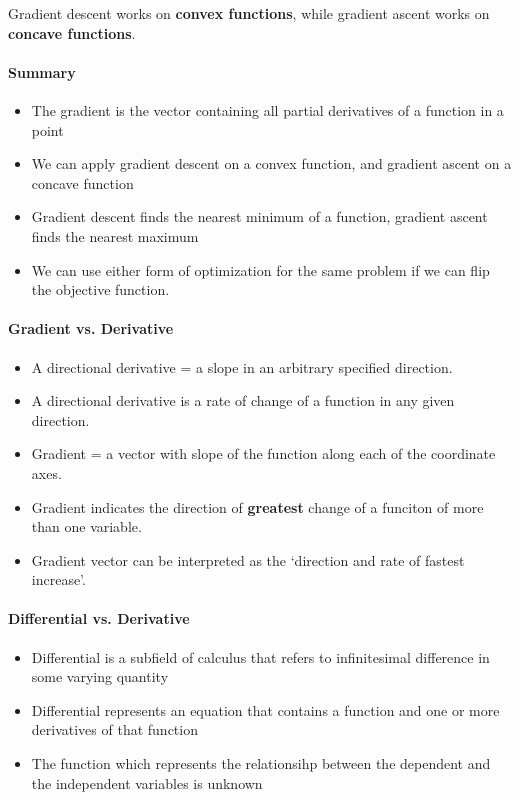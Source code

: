 \documentclass[lang=en,mode=geye,device=normal,color=blue,14pt]{elegantnote}
\DeclareMathOperator*{\1}{\mathbbm{1}}
\begin{document}
Gradient descent works on \textbf{convex functions}, while gradient ascent works on \textbf{concave functions}.

\paragraph{Summary}
\begin{itemize}
\item The gradient is the vector containing all partial derivatives of a function in a point
\item We can apply gradient descent on a convex function, and gradient ascent on a concave function
\item Gradient descent finds the nearest minimum of a function, gradient ascent finds the nearest maximum
\item We can use either form of optimization for the same problem if we can flip the objective function.
\end{itemize}

\paragraph{Gradient vs. Derivative}

\begin{itemize}
\item A directional derivative = a slope in an arbitrary specified direction.
\item A directional derivative is a rate of change of a function in any given direction.
\end{itemize}

\begin{itemize}
\item Gradient = a vector with slope of the function along each of the coordinate axes.
\item Gradient indicates the direction of \textbf{greatest} change of a funciton of more than one variable.
\item Gradient vector can be interpreted as the `direction and rate of fastest increase'.
\end{itemize}

\paragraph{Differential vs. Derivative}
\begin{itemize}
\item Differential is a subfield of calculus that refers to infinitesimal difference in some varying quantity
\item Differential represents an equation that contains a function and one or more derivatives of that function
\item The function which represents the relationsihp between the dependent and the independent variables is unknown
\end{itemize}
\end{document}
